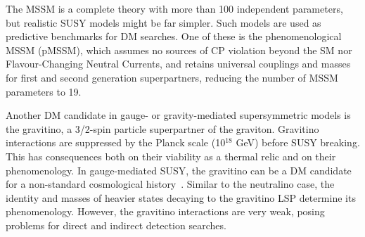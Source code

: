 The MSSM is a complete theory with more than 100 independent parameters, 
but realistic SUSY models might be far simpler.%
Such models are used as predictive benchmarks for DM searches. 
One of these is the phenomenological MSSM (pMSSM), which assumes no sources of CP violation beyond the SM nor Flavour-Changing Neutral Currents, and retains universal couplings and masses for first and second generation superpartners, reducing
the number of MSSM parameters to 19. 

Another DM candidate in gauge- or gravity-mediated supersymmetric models is the gravitino, 
a 3/2-spin particle superpartner of the graviton. 
Gravitino interactions are suppressed by the Planck scale (10$^{18}$ GeV) before SUSY breaking.
This has consequences both on their viability as a thermal relic and on their phenomenology. 
In gauge-mediated SUSY, the gravitino can be a DM candidate for a
non-standard cosmological history~\cite{Dimopoulos:1996vz}.
Similar to the neutralino case, the identity and masses of heavier states decaying to the gravitino LSP determine its phenomenology. 
However, the gravitino interactions are very weak, posing problems for direct and indirect detection searches. 

